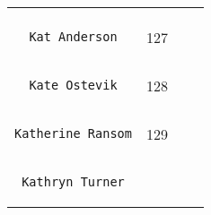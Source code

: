 \documentclass[]{article}
\begin{document}
\begin{longtable}[c]{@{}llll@{}}
\begin{minipage}[t]{0.15\columnwidth}
\end{minipage}
\\\noalign{\medskip}
\begin{minipage}[t]{0.39\columnwidth}\raggedright
\begin{verbatim}
  Kat Anderson
\end{verbatim}
\end{minipage} & \begin{minipage}[t]{0.10\columnwidth}\raggedright
127
\end{minipage} & \begin{minipage}[t]{0.13\columnwidth}\raggedright
\end{minipage} & \begin{minipage}[t]{0.15\columnwidth}\raggedright
\end{minipage}
\\\noalign{\medskip}
\begin{minipage}[t]{0.39\columnwidth}\raggedright
\begin{verbatim}
  Kate Ostevik
\end{verbatim}
\end{minipage} & \begin{minipage}[t]{0.10\columnwidth}\raggedright
128
\end{minipage} & \begin{minipage}[t]{0.13\columnwidth}\raggedright
\end{minipage} & \begin{minipage}[t]{0.15\columnwidth}\raggedright
\end{minipage}
\\\noalign{\medskip}
\begin{minipage}[t]{0.39\columnwidth}\raggedright
\begin{verbatim}
Katherine Ransom
\end{verbatim}
\end{minipage} & \begin{minipage}[t]{0.10\columnwidth}\raggedright
129
\end{minipage} & \begin{minipage}[t]{0.13\columnwidth}\raggedright
\end{minipage} & \begin{minipage}[t]{0.15\columnwidth}\raggedright
\end{minipage}
\\\noalign{\medskip}
\begin{minipage}[t]{0.39\columnwidth}\raggedright
\begin{verbatim}
 Kathryn Turner

\end{verbatim}
\end{minipage}
\end{longtable}
\end{document}
